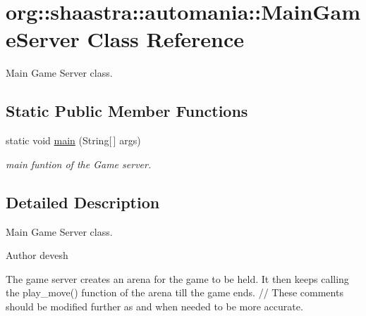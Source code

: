 \hypertarget{classorg_1_1shaastra_1_1automania_1_1MainGameServer}{
\section{\-o\-r\-g\-:\-:\-s\-h\-a\-a\-s\-t\-r\-a\-:\-:\-a\-u\-t\-o\-m\-a\-n\-i\-a\-:\-:\-M\-a\-i\-n\-G\-a\-m\-e\-S\-e\-r\-v\-e\-r \-C\-l\-a\-s\-s \-R\-e\-f\-e\-r\-e\-n\-c\-e}
\label{classorg_1_1shaastra_1_1automania_1_1MainGameServer}
}


Main Game Server class.  


\subsection*{Static Public Member Functions}
\begin{DoxyCompactItemize}
\item 
\-s\-t\-a\-t\-i\-c \-v\-o\-i\-d \hyperlink{classorg_1_1shaastra_1_1automania_1_1MainGameServer_af4b049b56f9f1d1a5cf5c1224d5f1c2f}{\-m\-a\-i\-n} \-(\-S\-t\-r\-i\-n\-g\mbox{[}$\,$\mbox{]} \-a\-r\-g\-s\-)
\begin{DoxyCompactList}\small\item\em main funtion of the Game server. \end{DoxyCompactList}\end{DoxyCompactItemize}


\subsection{Detailed Description}
Main Game Server class. 

\begin{DoxyAuthor}{Author}
devesh
\end{DoxyAuthor}
The game server creates an arena for the game to be held. It then keeps calling the \-p\-l\-a\-y\_\-\-m\-o\-v\-e\-(\-) function of the arena till the game ends. // These comments should be modified further as and when needed to be more accurate. 

